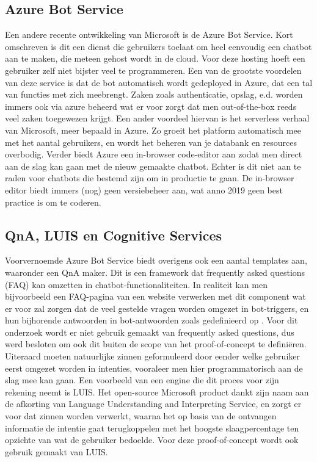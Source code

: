 \subsection{Azure Bot Service}
Een andere recente ontwikkeling van Microsoft is de Azure Bot Service. Kort omschreven is dit een dienst die gebruikers toelaat om heel eenvoudig een chatbot aan te maken, die meteen gehost wordt in de cloud. Voor deze hosting hoeft een gebruiker zelf niet bijster veel te programmeren. Een van de grootste voordelen van deze service is dat de bot automatisch wordt gedeployed in Azure, dat een tal van functies met zich meebrengt. Zaken zoals authenticatie, opslag, e.d. worden immers ook via azure beheerd wat er voor zorgt dat men out-of-the-box reeds veel zaken toegewezen krijgt. Een ander voordeel hiervan is het serverless verhaal van Microsoft, meer bepaald in Azure. Zo groeit het platform automatisch mee met het aantal gebruikers, en wordt het beheren van je databank en resources overbodig. 
Verder biedt Azure een in-browser code-editor aan zodat men direct aan de slag kan gaan met de nieuw gemaakte chatbot. Echter is dit niet aan te raden voor chatbots die bestemd zijn om in productie te gaan. De in-browser editor biedt immers (nog) geen versiebeheer aan, wat anno 2019 geen best practice is om te coderen. 

\subsection{QnA, LUIS en Cognitive Services}
Voorvernoemde Azure Bot Service biedt overigens ook een aantal templates aan, waaronder een QnA maker. Dit is een framework dat frequently asked questions (FAQ) kan omzetten in chatbot-functionaliteiten. In realiteit kan men bijvoorbeeld een FAQ-pagina van een website verwerken met dit component wat er voor zal zorgen dat de veel gestelde vragen worden omgezet in bot-triggers, en hun bijhorende antwoorden in bot-antwoorden zoals gedefinieerd op \textcite{Azure2019}. Voor dit onderzoek wordt er niet gebruik gemaakt van frequently asked questions, dus werd besloten om ook dit buiten de scope van het proof-of-concept te definiëren. 
Uiteraard moeten natuurlijke zinnen geformuleerd door eender welke gebruiker eerst omgezet worden in intenties, vooraleer men hier programmatorisch aan de slag mee kan gaan. Een voorbeeld van een engine die dit proces voor zijn rekening neemt is LUIS. Het open-source Microsoft product dankt zijn naam aan de afkorting van Language Understanding and Interpreting Service, en zorgt er voor dat zinnen worden verwerkt, waarna het op basis van de ontvangen informatie de intentie gaat terugkoppelen met het hoogste slaagpercentage ten opzichte van wat de gebruiker bedoelde. Voor deze proof-of-concept wordt ook gebruik gemaakt van LUIS.
